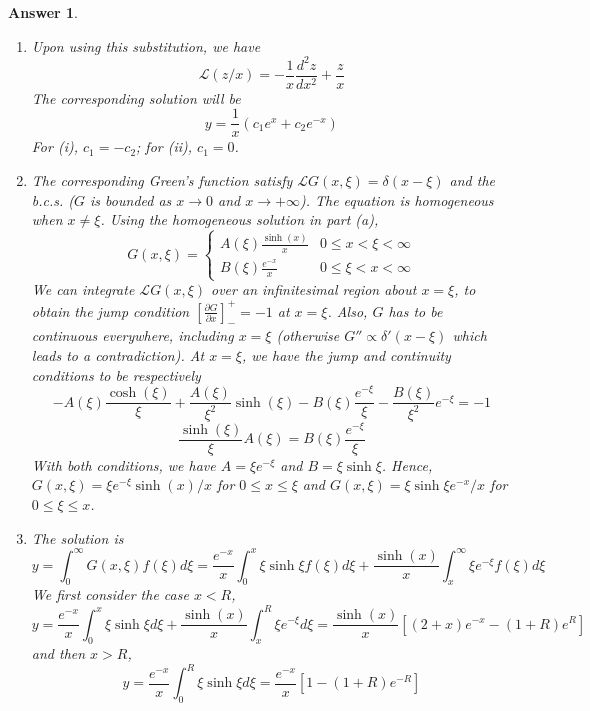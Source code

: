 \documentclass[a4paper]{article}
\newtheorem{ans}{Answer}[section]
\theoremstyle{new}
\begin{document}
\begin{ans}\leavevmode
\begin{enumerate}[label=(\alph*)]
\item Upon using this substitution, we have
$$\mathcal{L}(z/x)=-\frac{1}{x}\frac{d^2z}{dx^2}+\frac{z}{x}$$
The corresponding solution will be
$$y=\frac{1}{x}(c_1e^x+c_2e^{-x})$$
For (i), $c_1=-c_2$; for (ii), $c_1=0$.
\item The corresponding Green's function satisfy $\mathcal{L}G(x,\xi)=\delta(x-\xi)$ and the b.c.s. ($G$ is bounded as $x\rightarrow 0$ and $x\rightarrow+\infty$). The equation is homogeneous when $x\neq\xi$. Using the homogeneous solution in part (a),
$$G(x,\xi)=
\left\{
        \begin{array}{ll}
      A(\xi)\frac{\sinh(x)}{x} & 0\leq x<\xi<\infty\\
      B(\xi)\frac{e^{-x}}{x} & 0\leq\xi<x<\infty
        \end{array}
    \right.$$
We can integrate $\mathcal{L}G(x,\xi)$ over an infinitesimal region about $x=\xi$, to obtain the jump condition $[\frac{\partial G}{\partial x}]_-^+=-1$ at $x=\xi$. Also, $G$ has to be continuous everywhere, including $x=\xi$ (otherwise $G''\propto\delta'(x-\xi)$ which leads to a contradiction). At $x=\xi$, we have the jump and continuity conditions to be respectively
$$-A(\xi)\frac{\cosh(\xi)}{\xi}+\frac{A(\xi)}{\xi^2}\sinh(\xi)-B(\xi)\frac{e^{-\xi}}{\xi}-\frac{B(\xi)}{\xi^2}e^{-\xi}=-1$$
$$\frac{\sinh(\xi)}{\xi}A(\xi)=B(\xi)\frac{e^{-\xi}}{\xi}$$
With both conditions, we have $A=\xi e^{-\xi}$ and $B=\xi\sinh\xi$. Hence, $G(x,\xi)=\xi e^{-\xi}\sinh(x)/x$ for $0\leq x\leq\xi$ and $G(x,\xi)=\xi\sinh\xi e^{-x}/x$ for $0\leq\xi\leq x$. \item The solution is
$$y=\int_0^\infty G(x,\xi)f(\xi)d\xi=\frac{e^{-x}}{x}\int_0^x\xi\sinh\xi f(\xi) d\xi+\frac{\sinh(x)}{x}\int_x^\infty\xi e^{-\xi}f(\xi)d\xi$$
We first consider the case $x<R$,
$$y=\frac{e^{-x}}{x}\int_0^x\xi\sinh\xi d\xi+\frac{\sinh(x)}{x}\int_x^R\xi e^{-\xi}d\xi=\frac{\sinh(x)}{x}[(2+x)e^{-x}-(1+R)e^R]$$
and then $x>R$,
$$y=\frac{e^{-x}}{x}\int_0^R\xi\sinh\xi d\xi=\frac{e^{-x}}{x}[1-(1+R)e^{-R}]$$
\end{enumerate}
\end{ans}
\newpage
\end{document}
